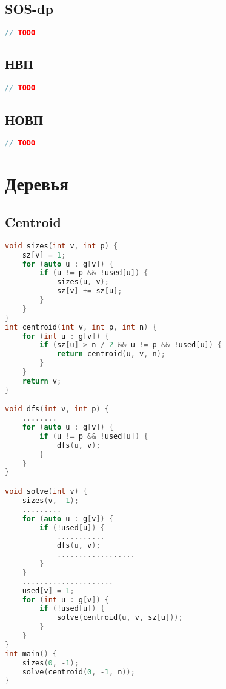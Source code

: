 \documentclass[10pt,a4paper,landscape,twosided]{extarticle}
\begin{document}
\begin{multicols*}{3}
\begin{lstlisting}[language=C++]
\end{lstlisting}

\subsection{SOS-dp}
\begin{lstlisting}[language=C++]
// TODO

\end{lstlisting}

\subsection{НВП}
\begin{lstlisting}[language=C++]
// TODO

\end{lstlisting}

\subsection{НОВП}
\begin{lstlisting}[language=C++]
// TODO

\end{lstlisting}

\section{Деревья}

\subsection{Centroid}
\begin{lstlisting}[language=C++]
void sizes(int v, int p) {
    sz[v] = 1;
    for (auto u : g[v]) {
        if (u != p && !used[u]) {
            sizes(u, v);
            sz[v] += sz[u];
        }
    }
}
int centroid(int v, int p, int n) {
    for (int u : g[v]) {
        if (sz[u] > n / 2 && u != p && !used[u]) {
            return centroid(u, v, n);
        }
    }
    return v;
}

void dfs(int v, int p) {
    ........
    for (auto u : g[v]) {
        if (u != p && !used[u]) {
            dfs(u, v);
        }
    }
}

void solve(int v) {
    sizes(v, -1);
    .........
    for (auto u : g[v]) {
        if (!used[u]) {
            ...........
            dfs(u, v);   
            ..................     
        }
    }
    .....................
    used[v] = 1;
    for (int u : g[v]) {
        if (!used[u]) {
            solve(centroid(u, v, sz[u]));
        }
    }
}
int main() {
    sizes(0, -1);
    solve(centroid(0, -1, n));
}



\end{lstlisting}
\end{multicols*}
\end{document}
